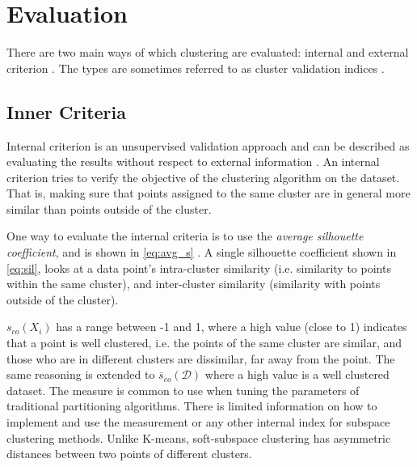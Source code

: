 \documentclass[../report.tex]{subfiles}
\begin{document}



\section{Evaluation}
There are two main ways of which clustering are evaluated: internal and external criterion \cite{manning2010introduction}. The types are sometimes referred to as cluster validation indices \cite{Halkidi2002}.

\subsection{Inner Criteria} \label{sec:Internal}
Internal criterion is an unsupervised validation approach and can be described as evaluating the results without respect to external information \cite{Halkidi2002}. An internal criterion tries to verify the objective of the clustering algorithm on the dataset. That is, making sure that points assigned to the same cluster are in general more similar than points outside of the cluster.

One way to evaluate the internal criteria is to use the \textit{average silhouette coefficient}, and is shown in \cref{eq:avg_s} \cite{ROUSSEEUW198753}. A single silhouette coefficient shown in \cref{eq:sil}, looks at a data point's intra-cluster similarity (i.e. similarity to points within the same cluster), and inter-cluster similarity (similarity with points outside of the cluster).

${s}_{co}(X_i)$ has a range between -1 and 1, where a high value (close to 1) indicates that a point is well clustered, i.e. the points of the same cluster are similar, and those who are in different clusters are dissimilar, far away from the point. The same reasoning is extended to $\overline{s}_{co}(\mathcal{D})$ where a high value is a well clustered dataset. The measure is common to use when tuning the parameters of traditional partitioning algorithms. There is limited information on how to implement and use the measurement or any other internal index for subspace clustering methods. Unlike K-means, soft-subspace clustering has asymmetric distances between two points of different clusters.
\end{document}
